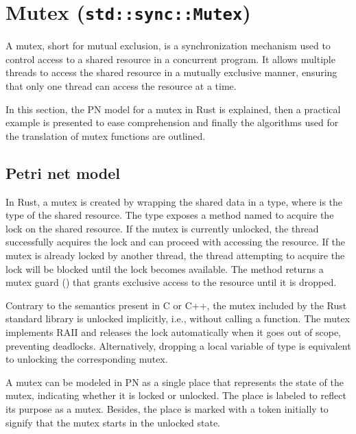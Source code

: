 \section{Mutex (\texttt{std::sync::Mutex})}

A mutex, short for mutual exclusion, is a synchronization mechanism
used to control access to a shared resource in a concurrent program.
It allows multiple threads to access the shared resource in a mutually exclusive manner,
ensuring that only one thread can access the resource at a time.

In this section, the \acrshort{PN} model for a mutex in Rust is explained,
then a practical example is presented to ease comprehension and finally
the algorithms used for the translation of mutex functions are outlined.

\subsection{Petri net model}

In Rust, a mutex is created by wrapping the shared data in a  type,
where  is the type of the shared resource.
The  type exposes a method named 
to acquire the lock on the shared resource.
If the mutex is currently unlocked,
the thread successfully acquires the lock and can proceed with accessing the resource.
If the mutex is already locked by another thread,
the thread attempting to acquire the lock will be blocked until the lock becomes available.
The  method returns a mutex guard ()
that grants exclusive access to the resource until it is dropped.

Contrary to the  semantics present in C or C++,
the mutex included by the Rust standard library is unlocked implicitly,
i.e., without calling a function.
The mutex implements \acrfull{RAII} and releases the lock automatically
when it goes out of scope, preventing deadlocks.
Alternatively, dropping a local variable of type 
is equivalent to unlocking the corresponding mutex.

A mutex can be modeled in \acrshort{PN} as a single place
that represents the state of the mutex,
indicating whether it is locked or unlocked.
The place is labeled to reflect its purpose as a mutex.
Besides, the place is marked with a token initially
to signify that the mutex starts in the unlocked state.

